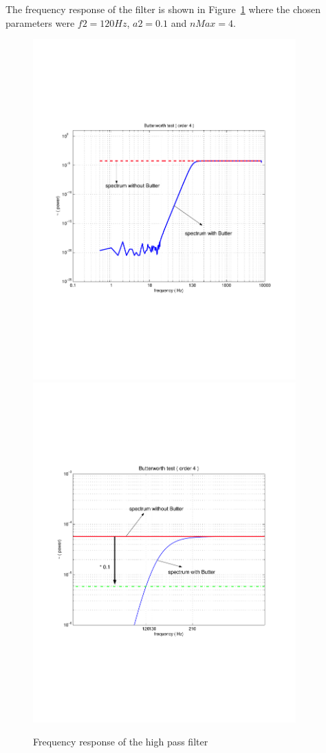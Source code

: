 The frequency response of the filter is shown in Figure~\ref{fig:butterworthtest4} 
where the chosen parameters were $f2 = 120Hz$, $a2 = 0.1$ and $nMax = 4$.
\begin{figure}[h]
\centering
\includegraphics[width=0.9\textwidth]{figures/butterworthtest4}
\includegraphics[width=0.9\textwidth]{figures/testattenuation4}
\caption{Frequency response of the high pass filter} \label{fig:butterworthtest4} 
\end{figure}
